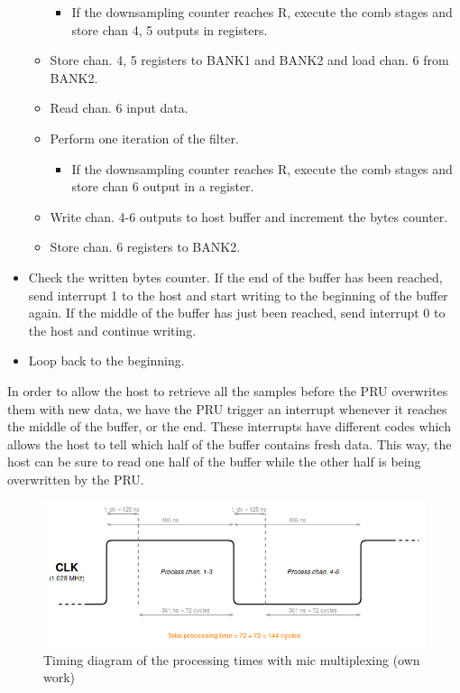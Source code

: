\documentclass[]{report}
\providecommand{\tightlist}{%
	\setlength{\itemsep}{0pt}\setlength{\parskip}{0pt}}
\begin{document}
\begin{itemize}
\begin{itemize}
    \begin{itemize}
    \tightlist
    \item
      If the downsampling counter reaches R, execute the comb stages and
      store chan 4, 5 outputs in registers.
    \end{itemize}
  \item
    Store chan. 4, 5 registers to BANK1 and BANK2 and load chan. 6 from
    BANK2.
  \item
    Read chan. 6 input data.
  \item
    Perform one iteration of the filter.

    \begin{itemize}
    \tightlist
    \item
      If the downsampling counter reaches R, execute the comb stages and
      store chan 6 output in a register.
    \end{itemize}
  \item
    Write chan. 4-6 outputs to host buffer and increment the bytes counter.
  \item
    Store chan. 6 registers to BANK2.
  \end{itemize}
\item
  Check the written bytes counter. If the end of the buffer has been
  reached, send interrupt 1 to the host and start writing to the
  beginning of the buffer again. If the middle of the buffer has just
  been reached, send interrupt 0 to the host and continue writing.
\item
  Loop back to the beginning.
\end{itemize}

In order to allow the host to retrieve all the samples before the PRU overwrites them with new data, we have the PRU trigger an interrupt whenever it reaches the middle of the buffer, or the end. These interrupts have different codes which allows the host to tell which half of the buffer contains fresh data. This way, the host can be sure to read one half of the buffer while the other half is being overwritten by the PRU.

\begin{figure}[H]
\centering
\includegraphics[width=1.0\linewidth]{Pictures/PRU_timing_diagram_mic_multiplexing.png}
\caption{Timing diagram of the processing times with mic multiplexing (own work)}
\label{fig:multiplex-mics}
\end{figure}
\end{document}
